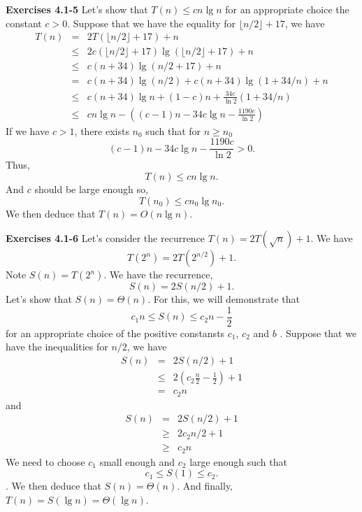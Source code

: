 \documentclass[a4paper,12pt]{article}
\newcommand{\newpar}[1]
{\bigskip \noindent \textbf{Exercises #1} \newline}
\begin{document}
\newpar{4.1-5}
Let's show that $T(n) \le c n\lg n$ for an appropriate choice the
constant $c > 0$.  Suppose that we have the equality for 
$\lfloor n/2\rfloor + 17$, we have
\begin{eqnarray*}
T(n) &=& 2 T(\lfloor n/2\rfloor + 17) + n \\
&\le& 2c(\lfloor n/2\rfloor+17)\lg(\lfloor n/2\rfloor+17) + n \\
&\le& c(n + 34)\lg(n/2+17) + n \\
&=& c(n+34)\lg(n/2) + c(n+34)\lg(1+34/n) + n \\
&\le& c(n+34) \lg n + (1-c) n + \frac{34c}{\ln 2}(1+34/n) \\
&\le& cn\lg n - \left((c-1) n - 34c\lg n - \frac{1190c}{\ln 2}\right)
\end{eqnarray*}
If we have $c > 1$, there exists $n_0$ such that for $n \ge n_0$
\[ (c-1) n - 34c\lg n - \frac{1190c}{\ln 2} > 0.\]
Thus,
\[ T(n) \le cn\lg n.\]
And $c$ should be large enough so,
\[ T(n_0) \le cn_0\lg n_0.\]
We then deduce that $T(n) = O(n\lg n)$.

\newpar{4.1-6}
Let's consider the recurrence $T(n) = 2T(\sqrt{n}) + 1$.  We have
\[ T(2^n) = 2T(2^{n/2}) + 1.\]
Note $S(n) = T(2^n)$.  We have the recurrence,
\[ S(n) = 2S(n/2) + 1.\]
Let's show that $S(n) = \Theta(n)$.  For this, we will demonstrate
that \[c_1n \le S(n) \le c_2n - \frac{1}{2}\] for an appropriate
choice of the positive constansts $c_1$, $c_2$ and $b$ . Suppose that
we have the inequalities for $n/2$, we have
\begin{eqnarray*}
S(n) &=& 2S(n/2) + 1 \\
&\le& 2\left(c_2\frac{n}{2} - \frac{1}{2}\right) + 1 \\
&=& c_2n
\end{eqnarray*}
and
\begin{eqnarray*}
S(n) &=& 2S(n/2) + 1 \\
&\ge& 2 c_2 n/2 + 1 \\
&\ge& c_2 n
\end{eqnarray*}
We need to choose $c_1$ small enough and $c_2$ large enough such that
\[ c_1 \le S(1) \le c_2.\].  We then deduce that $S(n) = \Theta(n)$.
And finally, $T(n) = S(\lg n) = \Theta(\lg n)$.
\end{document}
